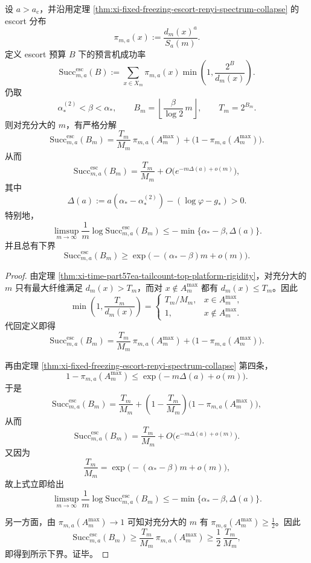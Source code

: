 \begin{theorem}\label{thm:xi-time-part57ea-frozen-escort-oracle-success-decomposition}
设 \(a>a_{\mathrm c}\)，并沿用定理 \ref{thm:xi-fixed-freezing-escort-renyi-spectrum-collapse} 的 escort 分布
\[
\pi_{m,a}(x):=\frac{d_m(x)^a}{S_a(m)}.
\]
定义 escort 预算 \(B\) 下的预言机成功率
\[
\mathrm{Succ}_{m,a}^{\mathrm{esc}}(B)
:=
\sum_{x\in X_m}\pi_{m,a}(x)\min\!\left(1,\frac{2^B}{d_m(x)}\right).
\]
仍取
\[
\alpha_*^{(2)}<\beta<\alpha_*,
\qquad
B_m=\left\lfloor \frac{\beta}{\log 2}\,m\right\rfloor,
\qquad
T_m=2^{B_m}.
\]
则对充分大的 \(m\)，有严格分解
\[
\boxed{\;
\mathrm{Succ}_{m,a}^{\mathrm{esc}}(B_m)
=
\frac{T_m}{M_m}\,\pi_{m,a}(A_m^{\max})
+
\bigl(1-\pi_{m,a}(A_m^{\max})\bigr).\;}
\]
从而
\[
\boxed{\;
\mathrm{Succ}_{m,a}^{\mathrm{esc}}(B_m)
=
\frac{T_m}{M_m}
+
O\!\bigl(e^{-m\Delta(a)+o(m)}\bigr),\;}
\]
其中
\[
\Delta(a):=a(\alpha_*-\alpha_*^{(2)})-(\log\varphi-g_*)>0.
\]
特别地，
\[
\boxed{\;
\limsup_{m\to\infty}\frac1m
\log \mathrm{Succ}_{m,a}^{\mathrm{esc}}(B_m)
\le
-\min\{\alpha_*-\beta,\Delta(a)\}.\;}
\]
并且总有下界
\[
\boxed{\;
\mathrm{Succ}_{m,a}^{\mathrm{esc}}(B_m)
\ge
\exp\!\bigl(-(\alpha_*-\beta)m+o(m)\bigr).\;}
\]
\end{theorem}
\begin{proof}
由定理 \ref{thm:xi-time-part57ea-tailcount-top-platform-rigidity}，对充分大的 \(m\) 只有最大纤维满足 \(d_m(x)>T_m\)，而对 \(x\notin A_m^{\max}\) 都有 \(d_m(x)\le T_m\)。因此
\[
\min\!\left(1,\frac{T_m}{d_m(x)}\right)
=
\begin{cases}
T_m/M_m, & x\in A_m^{\max},\\
1, & x\notin A_m^{\max}.
\end{cases}
\]
代回定义即得
\[
\mathrm{Succ}_{m,a}^{\mathrm{esc}}(B_m)
=
\frac{T_m}{M_m}\,\pi_{m,a}(A_m^{\max})
+
\bigl(1-\pi_{m,a}(A_m^{\max})\bigr).
\]

再由定理 \ref{thm:xi-fixed-freezing-escort-renyi-spectrum-collapse} 第四条，
\[
1-\pi_{m,a}(A_m^{\max})
\le
\exp\!\bigl(-m\Delta(a)+o(m)\bigr).
\]
于是
\[
\mathrm{Succ}_{m,a}^{\mathrm{esc}}(B_m)
=
\frac{T_m}{M_m}
+
\left(1-\frac{T_m}{M_m}\right)
\bigl(1-\pi_{m,a}(A_m^{\max})\bigr),
\]
从而
\[
\mathrm{Succ}_{m,a}^{\mathrm{esc}}(B_m)
=
\frac{T_m}{M_m}
+
O\!\bigl(e^{-m\Delta(a)+o(m)}\bigr).
\]
又因为
\[
\frac{T_m}{M_m}
=
\exp\!\bigl(-(\alpha_*-\beta)m+o(m)\bigr),
\]
故上式立即给出
\[
\limsup_{m\to\infty}\frac1m
\log \mathrm{Succ}_{m,a}^{\mathrm{esc}}(B_m)
\le
-\min\{\alpha_*-\beta,\Delta(a)\}.
\]

另一方面，由 \(\pi_{m,a}(A_m^{\max})\to 1\) 可知对充分大的 \(m\) 有 \(\pi_{m,a}(A_m^{\max})\ge \tfrac12\)。因此
\[
\mathrm{Succ}_{m,a}^{\mathrm{esc}}(B_m)
\ge
\frac{T_m}{M_m}\,\pi_{m,a}(A_m^{\max})
\ge
\frac12\,\frac{T_m}{M_m},
\]
即得到所示下界。证毕。
\end{proof}


